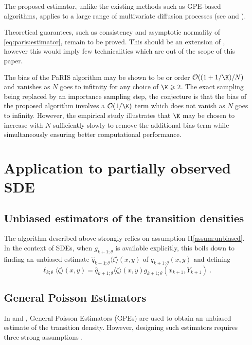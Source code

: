 \documentclass{article}
\newcommand{\md}[1]{g_{#1}}
\newcommand{\parvec}{\theta}
\newcommand{\hd}[1]{q_{#1}}
\newcommand{\hdhat}[1]{\widehat{q}_{#1}}
\newcommand{\N}{N}
\newcommand{\eqsp}{\;}
\newcommand{\hatqg}[1]{\mathsf{\ell}_{#1}}
\begin{document}
The proposed estimator, unlike the existing methods such as GPE-based algorithms, applies to a large range of multivariate diffusion processes (see \cite{andersson2017unbiased} and \cite{fearnhead2017continuous}).

Theoretical guarantees, such as consistency and asymptotic normality of \eqref{eq:paris:estimator}, remain to be proved. 
This should be an extension of \cite{gloaguen2019pseudo}, however this would imply few technicalities which are out of the scope of this paper.

The bias of the PaRIS algorithm may be shown to be or order $\mathcal{O}((1 + 1/\K)/\N)$ and vanishes as $\N$ goes to infitnity for any choice of $\K\geqslant 2$. 
The exact sampling being replaced by an importance sampling step, the conjecture is that  the bias of the proposed algorithm involves a $\mathcal{O}(1/\K)$ term which does not vanish as $\N$ goes to infinity. 
However, the empirical study illustrates that $\K$ may be chosen to increase with $\N$ sufficiently slowly to remove the additional bias term while simultaneously ensuring better computational performance. %




\appendix 

\section{Application to partially observed SDE}
\label{sec:filter:SDE}

\subsection{Unbiased estimators of the transition densities}

The algorithm described above strongly relies on assumption H\ref{assum:unbiased}. 
In the context of SDEs, when $\md{k+1;\parvec}$ is available explicitly, this boils down to finding an unbiased estimate $\hdhat{k+1;\parvec}\langle \zeta\rangle(x,y)$ of $\hd{k+1;\parvec}(x,y)$ and defining
\[
\hatqg{k;\parvec}\langle \zeta\rangle(x,y) = \hdhat{k+1;\parvec}\langle \zeta\rangle(x,y)\md{k+1;\parvec}(x_{k+1},Y_{k+1})\eqsp.
\]

\subsection{General Poisson Estimators}
In \cite{olsson2011particle} and \cite{gloaguen2018online}, General Poisson Estimators (GPEs) are used to obtain an unbiased estimate of the transition density.  However, designing such estimators requires three strong assumptions \cite{beskos2006retrospective}.
\end{document}
